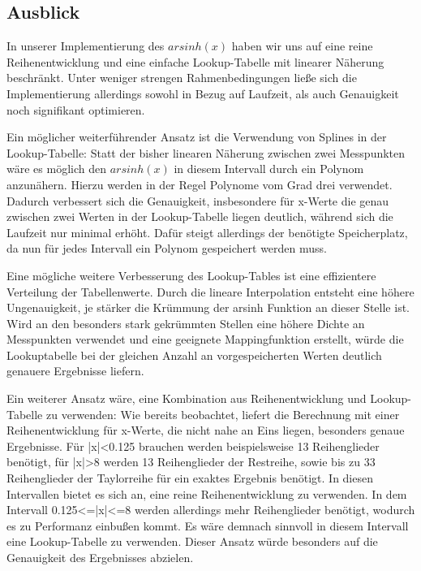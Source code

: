 \documentclass[course=erap] {aspdoc}
\begin{document}
    \subsection{Ausblick}

    In unserer Implementierung des $arsinh(x)$ haben wir uns auf eine reine Reihenentwicklung und eine einfache Lookup-Tabelle mit linearer Näherung beschränkt.
    Unter weniger strengen Rahmenbedingungen ließe sich die Implementierung allerdings sowohl in Bezug auf Laufzeit, als auch Genauigkeit noch signifikant optimieren.

    Ein möglicher weiterführender Ansatz ist die Verwendung von Splines in der Lookup-Tabelle:
    Statt der bisher linearen Näherung zwischen zwei Messpunkten wäre es möglich den $arsinh(x)$ in diesem Intervall durch ein Polynom anzunähern.
    Hierzu werden in der Regel Polynome vom Grad drei verwendet.~\cite{????}
    Dadurch verbessert sich die Genauigkeit, insbesondere für x-Werte die genau zwischen zwei Werten in der Lookup-Tabelle liegen deutlich, während sich die Laufzeit nur minimal erhöht.
    Dafür steigt allerdings der benötigte Speicherplatz, da nun für jedes Intervall ein Polynom gespeichert werden muss.

    Eine mögliche weitere Verbesserung des Lookup-Tables ist eine effizientere Verteilung der Tabellenwerte.
    Durch die lineare Interpolation entsteht eine höhere Ungenauigkeit, je stärker die Krümmung der arsinh Funktion an dieser Stelle ist.
    Wird an den besonders stark gekrümmten Stellen eine höhere Dichte an Messpunkten verwendet und eine geeignete Mappingfunktion erstellt, würde die Lookuptabelle bei der gleichen Anzahl an vorgespeicherten Werten deutlich genauere Ergebnisse liefern.

    Ein weiterer Ansatz wäre, eine Kombination aus Reihenentwicklung und Lookup-Tabelle zu verwenden:
    Wie bereits beobachtet, liefert die Berechnung mit einer Reihenentwicklung für x-Werte, die nicht nahe an Eins liegen, besonders genaue Ergebnisse.
    Für |x|<0.125 brauchen werden beispielsweise 13 Reihenglieder benötigt, für |x|>8 werden 13 Reihenglieder der Restreihe, sowie bis zu 33 Reihenglieder der Taylorreihe für ein exaktes Ergebnis benötigt.
    In diesen Intervallen bietet es sich an, eine reine Reihenentwicklung zu verwenden.
    In dem Intervall 0.125<=|x|<=8 werden allerdings mehr Reihenglieder benötigt, wodurch es zu Performanz einbußen kommt.
    Es wäre demnach sinnvoll in diesem Intervall eine Lookup-Tabelle zu verwenden.
    Dieser Ansatz würde besonders auf die Genauigkeit des Ergebnisses abzielen.
\end{document}
